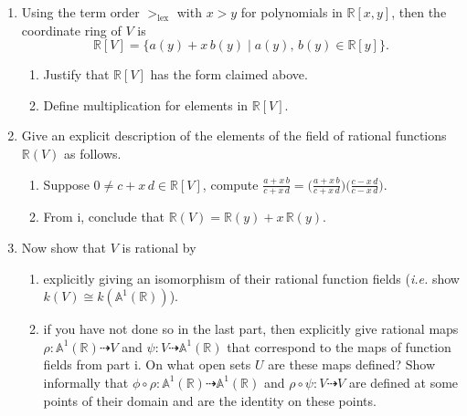 \documentclass[11pt]{report}
\newcommand\RR{{\mathbb R}}
\newcommand\A{{\mathbb A}}
\newcommand\lex{>_{\operatorname{lex}}}
\newcommand\dsp{\displaystyle}
\begin{document}
\begin{enumerate}
\begin{enumerate}
\item Using the term order $\lex$ with $x > y$ for polynomials
in $\RR[x,y]$, then the coordinate ring of $V$ is
$$
\RR[V] = \{ a(y) + x \,  b(y) \mid a(y), \, b(y) \in \RR[y]\}.
$$

\begin{enumerate}

\item Justify that $\RR[V]$ has the form claimed above.

\item Define multiplication for elements in $\RR[V]$.

\end{enumerate}

\item Give an explicit description of the elements of the field of rational
functions $\RR(V)$ as follows.

\begin{enumerate}

\item Suppose $0 \neq c + x \, d \in \RR[V]$, compute
$\dsp \frac{a + x \, b}{ c + x \, d} = \bigg( \frac{a + x \, b}{ c + x \, d} \bigg) \bigg(\frac{c - x \, d}{ c - x \, d} \bigg)$.

\smallskip

\item From i, conclude that $\RR(V) = \RR(y) + x \,  \RR(y)$.

\end{enumerate}

\item Now show that $V$ is rational by 

\begin{enumerate}

\item explicitly giving an isomorphism of their 
rational function fields (\emph{i.e.} show $k(V) \cong k(\A^1(\RR))$).

\item if you have not done so in the last part, then explicitly give rational
maps $\rho: \A^1(\RR) \dasharrow V$ and $\psi: V \dasharrow \A^1(\RR)$ that correspond 
to the maps of function fields from part i.  On what open sets $U$ are these maps defined?
Show informally that $\phi \circ \rho: \A^1(\RR) \dasharrow \A^1(\RR)$ and 
$\rho \circ \psi: V \dasharrow V$ are defined at some points of their domain and
are the identity on these points.

\end{enumerate}


\end{enumerate}
\end{enumerate}
\end{document}
